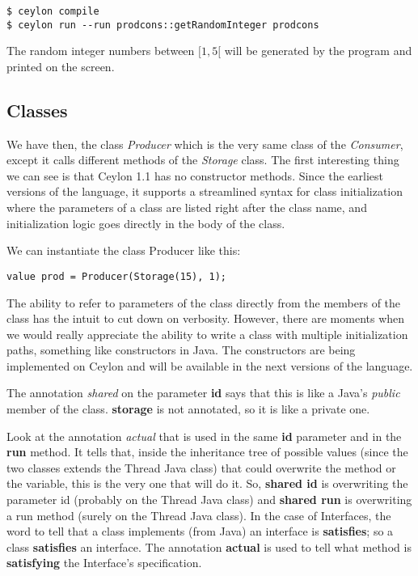 \documentclass{abnt}
\begin{document}
\begin{verbatim}
$ ceylon compile
$ ceylon run --run prodcons::getRandomInteger prodcons
\end{verbatim}

The random integer numbers between $[1, 5[$ will be generated by the program and
printed on the screen.

\subsection{Classes}

We have then, the class \textit{Producer} which is the very same class of the
\textit{Consumer}, except it calls different methods of the \textit{Storage} class. The
first interesting thing we can see is that Ceylon 1.1 has no constructor
methods. Since the earliest versions of the language, it supports a streamlined
syntax for class initialization where the parameters of a class are listed right
after the class name, and initialization logic goes directly in the body of the
class\cite{2_2}.

We can instantiate the class Producer like this:

\begin{lstlisting}[label=cpc,caption=Ceylon Producer-Consumer example]
value prod = Producer(Storage(15), 1);
\end{lstlisting}

The ability to refer to parameters of the class directly from the members of the
class has the intuit to cut down on verbosity. However, there are moments when
we would really appreciate the ability to write a class with multiple
initialization paths, something like constructors in Java. The constructors are
being implemented on Ceylon and will be available in the next versions of the
language.

The annotation \textit{shared} on the parameter \textbf{id} says that this is like a Java's
\textit{public} member of the class. \textbf{storage} is not annotated, so it is like a
private one.

Look at the annotation \textit{actual} that is used in the same \textbf{id} parameter and in
the \textbf{run} method. It tells that, inside the inheritance tree of possible
values (since the two classes extends the Thread Java class) that could
overwrite the method or the variable, this is the very one that will do it. So,
\textbf{shared id} is overwriting the parameter id (probably on the Thread Java
class) and \textbf{shared run} is overwriting a run method (surely on the Thread Java
class). In the case of Interfaces, the word to tell that a class implements
(from Java) an interface is \textbf{satisfies}; so a class \textbf{satisfies} an
interface. The annotation \textbf{actual} is used to tell what method is
\textbf{satisfying} the Interface's specification.
\end{document}
